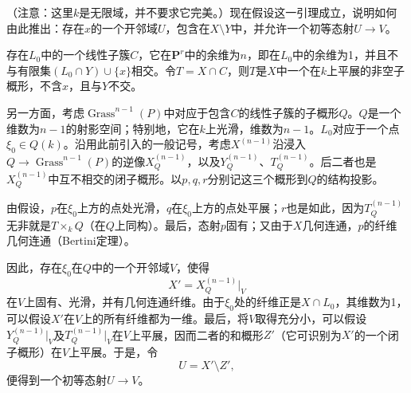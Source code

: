 （注意：这里$k$是无限域，并不要求它完美。）现在假设这一引理成立，说明如何由此推出：存在$x$的一个开邻域$U$，包含在$X\setminus Y$中，并允许一个初等态射$U\to V$。


存在$L_0$中的一个线性子簇$C$，它在$\mathbf P^r$中的余维为$n$，即在$L_0$中的余维为1，并且不与有限集$(L_0\cap Y)\cup\{x\}$相交。令$T=X\cap C$，则$T$是$X$中一个在$k$上平展的非空子概形，不含$x$，且与$Y$不交。

另一方面，考虑$\operatorname{Grass}^{n-1}(P)$中对应于包含$C$的线性子簇的子概形$Q$。$Q$是一个维数为$n-1$的射影空间；特别地，它在$k$上光滑，维数为$n-1$。$L_0$对应于一个点$\xi_0\in Q(k)$。沿用此前引入的一般记号，考虑$X^{(n-1)}$沿浸入$Q\to\operatorname{Grass}^{n-1}(P)$的逆像$X_Q^{(n-1)}$，以及$Y_Q^{(n-1)}$、$T_Q^{(n-1)}$。后二者也是$X_Q^{(n-1)}$中互不相交的闭子概形。以$p,q,r$分别记这三个概形到$Q$的结构投影。

由假设，$p$在$\xi_0$上方的点处光滑，$q$在$\xi_0$上方的点处平展；$r$也是如此，因为$T_Q^{(n-1)}$无非就是$T\times_k Q$（在$Q$上同构）。最后，态射$p$固有；又由于$X$几何连通，$p$的纤维几何连通（Bertini定理）。

因此，存在$\xi_0$在$Q$中的一个开邻域$V$，使得
\[
X'=X_Q^{(n-1)}\big|_V
\]
在$V$上固有、光滑，并有几何连通纤维。由于$\xi_0$处的纤维正是$X\cap L_0$，其维数为1，可以假设$X'$在$V$上的所有纤维都为一维。最后，将$V$取得充分小，可以假设$Y_Q^{(n-1)}|_V$及$T_Q^{(n-1)}|_V$在$V$上平展，因而二者的和概形$Z'$（它可识别为$X'$的一个闭子概形）在$V$上平展。于是，令
\[
U=X'\setminus Z',
\]
便得到一个初等态射$U\to V$。

